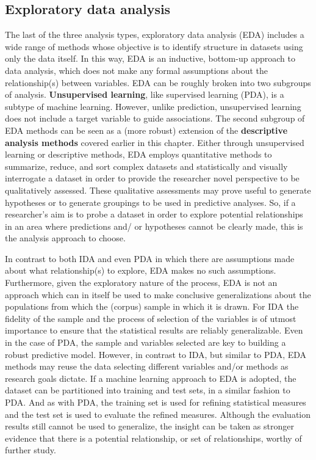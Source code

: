 \documentclass[
  letterpaper,
]{scrbook}
\begin{document}
\hypertarget{exploratory-data-analysis}{%
\subsection{Exploratory data analysis}\label{exploratory-data-analysis}}

The last of the three analysis types, exploratory data analysis (EDA)
includes a wide range of methods whose objective is to identify
structure in datasets using only the data itself. In this way, EDA is an
inductive, bottom-up approach to data analysis, which does not make any
formal assumptions about the relationship(s) between variables. EDA can
be roughly broken into two subgroups of analysis. \textbf{Unsupervised
learning}, like supervised learning (PDA), is a subtype of machine
learning. However, unlike prediction, unsupervised learning does not
include a target variable to guide associations. The second subgroup of
EDA methods can be seen as a (more robust) extension of the
\textbf{descriptive analysis methods} covered earlier in this chapter.
Either through unsupervised learning or descriptive methods, EDA employs
quantitative methods to summarize, reduce, and sort complex datasets and
statistically and visually interrogate a dataset in order to provide the
researcher novel perspective to be qualitatively assessed. These
qualitative assessments may prove useful to generate hypotheses or to
generate groupings to be used in predictive analyses. So, if a
researcher's aim is to probe a dataset in order to explore potential
relationships in an area where predictions and/ or hypotheses cannot be
clearly made, this is the analysis approach to choose.

In contrast to both IDA and even PDA in which there are assumptions made
about what relationship(s) to explore, EDA makes no such assumptions.
Furthermore, given the exploratory nature of the process, EDA is not an
approach which can in itself be used to make conclusive generalizations
about the populations from which the (corpus) sample in which it is
drawn. For IDA the fidelity of the sample and the process of selection
of the variables is of utmost importance to ensure that the statistical
results are reliably generalizable. Even in the case of PDA, the sample
and variables selected are key to building a robust predictive model.
However, in contrast to IDA, but similar to PDA, EDA methods may reuse
the data selecting different variables and/or methods as research goals
dictate. If a machine learning approach to EDA is adopted, the dataset
can be partitioned into training and test sets, in a similar fashion to
PDA. And as with PDA, the training set is used for refining statistical
measures and the test set is used to evaluate the refined measures.
Although the evaluation results still cannot be used to generalize, the
insight can be taken as stronger evidence that there is a potential
relationship, or set of relationships, worthy of further study.
\end{document}
